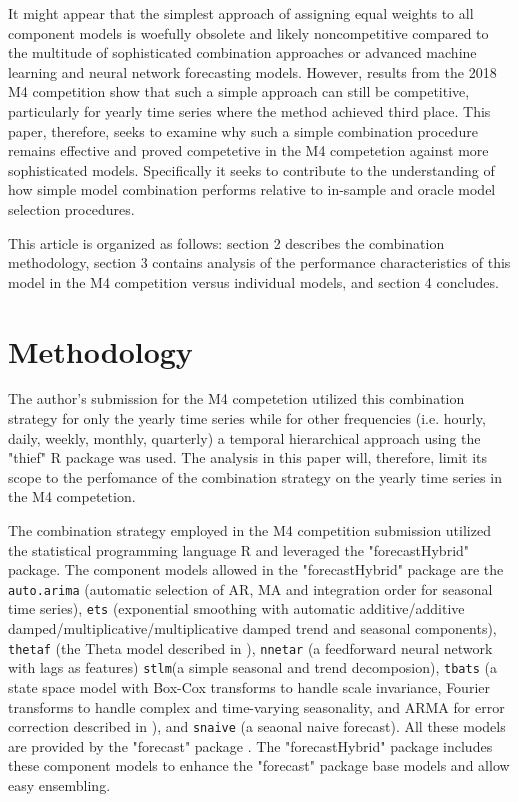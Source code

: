 \documentclass[11pt,3p,review,authoryear]{elsarticle}
\begin{document}
It might appear that the simplest approach of assigning equal weights to all component models is woefully obsolete and likely noncompetitive compared to the multitude of sophisticated combination approaches or advanced machine learning and neural network forecasting models. However, results from the 2018 M4 competition \citep{M4} show that such a simple approach can still be competitive, particularly for yearly time series where the method achieved third place. This paper, therefore, seeks to examine why such a simple combination procedure remains effective and proved competetive in the M4 competetion against more sophisticated models. Specifically it seeks to contribute to the understanding of how simple model combination performs relative to in-sample and oracle model selection procedures.


This article is organized as follows: section 2 describes the combination methodology, section 3 contains analysis of the performance characteristics of this model in the M4 competition versus individual models, and section 4 concludes.


\section{Methodology}
The author's submission for the M4 competetion utilized this combination strategy for only the yearly time series while for other frequencies (i.e. hourly, daily, weekly, monthly, quarterly) a temporal hierarchical approach using the "thief" R package \citep{ATHANASOPOULOS201760} was used. The analysis in this paper will, therefore, limit its scope to the perfomance of the combination strategy on the yearly time series in the M4 competetion.


The combination strategy employed in the M4 competition submission utilized the statistical programming language R \citep{Rlang} and leveraged the "forecastHybrid" \citep{forecastHybrid} package. The component models allowed in the "forecastHybrid" package are the  \lstinline{auto.arima} (automatic selection of AR, MA and integration order for seasonal time series), \lstinline{ets} (exponential smoothing with automatic additive/additive damped/multiplicative/multiplicative damped trend and seasonal components), \lstinline{thetaf} (the Theta model described in \citep{THETA}), \lstinline{nnetar} (a feedforward neural network with lags as features) \lstinline{stlm}(a simple seasonal and trend decomposion), \lstinline{tbats} (a state space model with Box-Cox transforms to handle scale invariance, Fourier transforms to handle complex and time-varying seasonality, and ARMA for error correction described in \citep{TBATS}), and \lstinline{snaive} (a seaonal naive forecast). All these models are provided by the "forecast" package \citep{Forecast}. The "forecastHybrid" package includes these component models to enhance the "forecast" package base models and allow easy ensembling.
\end{document}
